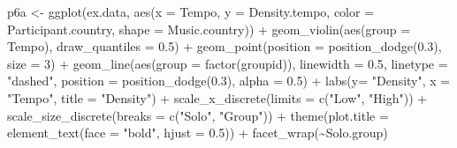 \documentclass[
  bookmarksnumbered]{article}
\newenvironment{Shaded}{\begin{snugshade}}{\end{snugshade}}
\newcommand{\AttributeTok}[1]{\textcolor[rgb]{0.80,0.80,0.80}{#1}}
\newcommand{\DecValTok}[1]{\textcolor[rgb]{0.86,0.86,0.80}{#1}}
\newcommand{\FloatTok}[1]{\textcolor[rgb]{0.75,0.75,0.82}{#1}}
\newcommand{\FunctionTok}[1]{\textcolor[rgb]{0.94,0.94,0.56}{#1}}
\newcommand{\NormalTok}[1]{\textcolor[rgb]{0.80,0.80,0.80}{#1}}
\newcommand{\OtherTok}[1]{\textcolor[rgb]{0.94,0.94,0.56}{#1}}
\newcommand{\SpecialCharTok}[1]{\textcolor[rgb]{0.86,0.64,0.64}{#1}}
\newcommand{\StringTok}[1]{\textcolor[rgb]{0.80,0.58,0.58}{#1}}
\begin{document}
\begin{Shaded}
\begin{Highlighting}[]
\NormalTok{p6a }\OtherTok{\textless{}{-}} \FunctionTok{ggplot}\NormalTok{(ex.data, }\FunctionTok{aes}\NormalTok{(}\AttributeTok{x =}\NormalTok{ Tempo, }\AttributeTok{y =}\NormalTok{ Density.tempo, }
                           \AttributeTok{color =}\NormalTok{ Participant.country, }\AttributeTok{shape =}\NormalTok{ Music.country)) }\SpecialCharTok{+}
  \FunctionTok{geom\_violin}\NormalTok{(}\FunctionTok{aes}\NormalTok{(}\AttributeTok{group =}\NormalTok{ Tempo), }\AttributeTok{draw\_quantiles =} \FloatTok{0.5}\NormalTok{) }\SpecialCharTok{+}
  \FunctionTok{geom\_point}\NormalTok{(}\AttributeTok{position =} \FunctionTok{position\_dodge}\NormalTok{(}\FloatTok{0.3}\NormalTok{), }\AttributeTok{size =} \DecValTok{3}\NormalTok{) }\SpecialCharTok{+}
  \FunctionTok{geom\_line}\NormalTok{(}\FunctionTok{aes}\NormalTok{(}\AttributeTok{group =} \FunctionTok{factor}\NormalTok{(groupid)), }
            \AttributeTok{linewidth =} \FloatTok{0.5}\NormalTok{, }\AttributeTok{linetype =} \StringTok{"dashed"}\NormalTok{, }\AttributeTok{position =} \FunctionTok{position\_dodge}\NormalTok{(}\FloatTok{0.3}\NormalTok{), }\AttributeTok{alpha =} \FloatTok{0.5}\NormalTok{) }\SpecialCharTok{+}
  \FunctionTok{labs}\NormalTok{(}\AttributeTok{y=} \StringTok{"Density"}\NormalTok{, }\AttributeTok{x =} \StringTok{"Tempo"}\NormalTok{, }\AttributeTok{title =} \StringTok{"Density"}\NormalTok{) }\SpecialCharTok{+}
  \FunctionTok{scale\_x\_discrete}\NormalTok{(}\AttributeTok{limits =} \FunctionTok{c}\NormalTok{(}\StringTok{"Low"}\NormalTok{, }\StringTok{"High"}\NormalTok{)) }\SpecialCharTok{+} 
  \FunctionTok{scale\_size\_discrete}\NormalTok{(}\AttributeTok{breaks =} \FunctionTok{c}\NormalTok{(}\StringTok{"Solo"}\NormalTok{, }\StringTok{"Group"}\NormalTok{)) }\SpecialCharTok{+} 
  \FunctionTok{theme}\NormalTok{(}\AttributeTok{plot.title =} \FunctionTok{element\_text}\NormalTok{(}\AttributeTok{face =} \StringTok{"bold"}\NormalTok{, }\AttributeTok{hjust =} \FloatTok{0.5}\NormalTok{)) }\SpecialCharTok{+} 
  \FunctionTok{facet\_wrap}\NormalTok{(}\SpecialCharTok{\textasciitilde{}}\NormalTok{Solo.group)}


\end{Highlighting}
\end{Shaded}
\end{document}

